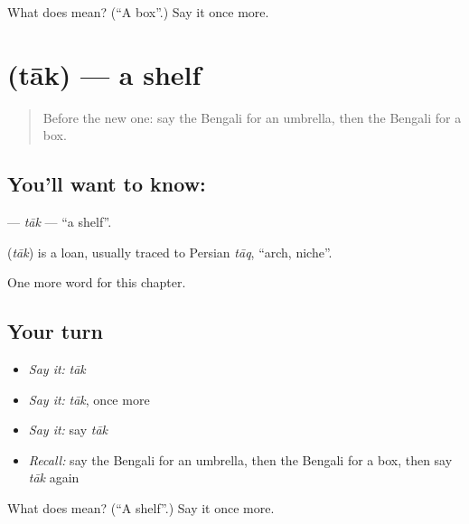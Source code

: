 \begin{tcolorbox}[breakable,colback=teal!4,colframe=teal!35!black,title={Before you move on}]
What does  mean? (\textquotedblleft{}A box\textquotedblright{}.) Say it once more.
\end{tcolorbox}
\section[\texorpdfstring{\bn{তাক} (tāk)}{তাক (tāk)}]{ (tāk) — a shelf}

\label{lesson:BN-C112-tak}



\begin{quote}
Before the new one: say the Bengali for an umbrella, then the Bengali for a box.
\end{quote}

\subsection*{You'll want to know: }
\textbf{} — \emph{tāk} — \textquotedblleft{}a shelf\textquotedblright{}.

\begin{cousinweb}
\textbf{} (\emph{tāk}) is a loan, usually traced to Persian \emph{tāq}, \textquotedblleft{}arch, niche\textquotedblright{}.
\end{cousinweb}

\begin{grammarlens}[title={What you've built}]
One more word for this chapter.
\end{grammarlens}

\subsection*{Your turn}
\begin{itemize}
\raggedright
  \item \emph{Say it:} \emph{tāk}
  \item \emph{Say it:} \emph{tāk}, once more
  \item \emph{Say it:} say \emph{tāk}
  \item \emph{Recall:} say the Bengali for an umbrella, then the Bengali for a box, then say \emph{tāk} again
\end{itemize}

\begin{tcolorbox}[breakable,colback=teal!4,colframe=teal!35!black,title={Before you move on}]
What does  mean? (\textquotedblleft{}A shelf\textquotedblright{}.) Say it once more.
\end{tcolorbox}
